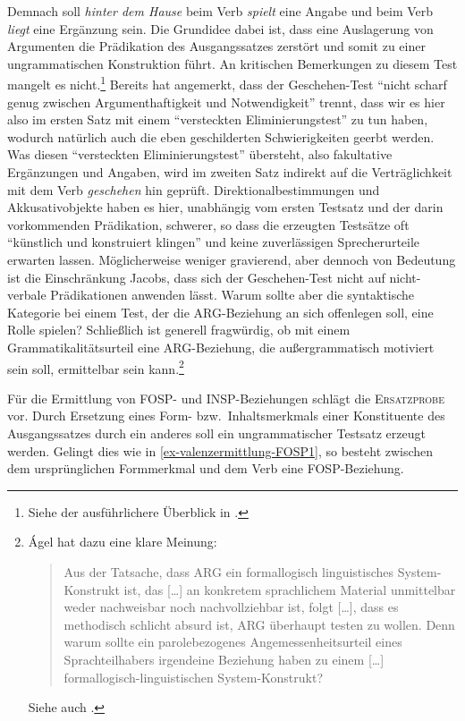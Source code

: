 Demnach soll {\it hinter dem Hause} beim Verb {\it spielt} eine Angabe und beim Verb {\it liegt} eine Ergänzung sein. Die Grundidee dabei ist, dass eine Auslagerung von Argumenten die Prädikation des Ausgangssatzes zerstört und somit zu einer ungrammatischen Konstruktion führt. An kritischen Bemerkungen zu diesem Test mangelt es nicht.\footnote{Siehe der ausführlichere Überblick in \citet[178f]{Agel:00}.} Bereits \cite{Jacobs:94} hat angemerkt, dass der Geschehen-Test "`nicht scharf genug zwischen Argumenthaftigkeit und Notwendigkeit"' \citep[Fußnote 16]{Jacobs:94} trennt, dass wir es hier also im ersten Satz mit einem "`versteckten Eliminierungstest"' \citep[178]{Agel:00} zu tun haben, wodurch natürlich auch die eben geschilderten Schwierigkeiten geerbt werden. Was diesen "`versteckten Eliminierungstest"' übersteht, also fakultative Ergänzungen und Angaben, wird im zweiten Satz indirekt auf die Verträglichkeit mit dem Verb {\it geschehen} hin geprüft. Direktionalbestimmungen und Akkusativobjekte haben es hier, unabhängig vom ersten Testsatz und der darin vorkommenden Prädikation, schwerer, so dass die erzeugten Testsätze oft "`künstlich und konstruiert klingen"' \citep[76]{Storrer:92} und keine zuverlässigen Sprecherurteile erwarten lassen. Möglicherweise weniger gravierend, aber dennoch von Bedeutung ist die Einschränkung Jacobs, dass sich der Geschehen-Test nicht auf nicht-verbale Prädikationen anwenden lässt. Warum sollte aber die syntaktische Kategorie bei einem Test, der die ARG-Beziehung an sich offenlegen soll, eine Rolle spielen? Schlie\ss lich ist generell fragwürdig, ob mit einem Grammatikalitätsurteil eine ARG-Beziehung, die au\ss ergrammatisch motiviert sein soll, ermittelbar sein kann.\footnote{\'Agel hat dazu eine klare Meinung: 
\begin{quote}
Aus der Tatsache, dass ARG ein formallogisch linguistisches System-Konstrukt ist, das [\ldots] an konkretem sprachlichem Material unmittelbar weder nachweisbar noch nachvollziehbar ist, folgt [\ldots], dass es methodisch schlicht absurd ist, ARG überhaupt testen zu wollen. Denn warum sollte ein parolebezogenes Angemessenheitsurteil eines Sprachteilhabers irgendeine Beziehung haben zu einem [\ldots] formal\-logisch-linguistischen System-Konstrukt? \citep[179]{Agel:00}
\end{quote} 
Siehe auch \citet[235]{Storrer:92}.}  %




Für die Ermittlung von FOSP- und INSP-Beziehungen schlägt \citet[180]{Agel:00} die \textsc{Ersatzprobe} vor. Durch Ersetzung eines Form- bzw.\ Inhaltsmerkmals einer Konstituente des Ausgangssatzes durch ein anderes soll ein ungrammatischer Testsatz erzeugt werden. Gelingt dies wie in \ref{ex-valenzermittlung-FOSP1}, so besteht zwischen dem ursprünglichen Formmerkmal und dem Verb eine FOSP-Beziehung. 

